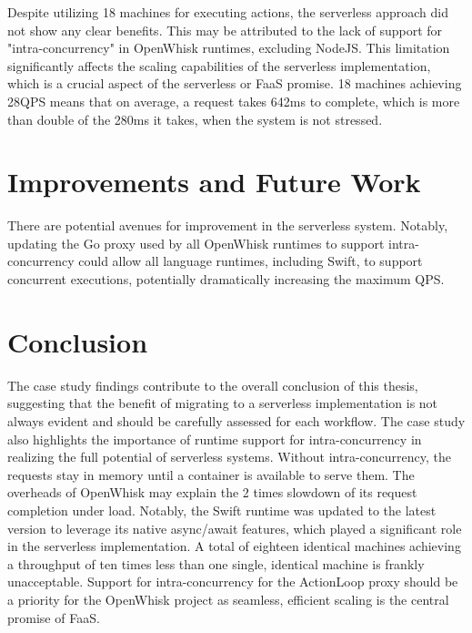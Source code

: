 Despite utilizing 18 machines for executing actions, the serverless approach did not show any clear benefits. This may be attributed to the lack of support for "intra-concurrency" in OpenWhisk runtimes, excluding NodeJS. This limitation significantly affects the scaling capabilities of the serverless implementation, which is a crucial aspect of the serverless or FaaS promise. 18 machines achieving 28QPS means that on average, a request takes 642ms to complete, which is more than double of the 280ms it takes, when the system is not stressed.

\section{Improvements and Future Work}

There are potential avenues for improvement in the serverless system. Notably, updating the Go proxy used by all OpenWhisk runtimes to support intra-concurrency could allow all language runtimes, including Swift, to support concurrent executions, potentially dramatically increasing the maximum QPS.

\section{Conclusion}

The case study findings contribute to the overall conclusion of this thesis, suggesting that the benefit of migrating to a serverless implementation is not always evident and should be carefully assessed for each workflow. The case study also highlights the importance of runtime support for intra-concurrency in realizing the full potential of serverless systems. Without intra-concurrency, the requests stay in memory until a container is available to serve them. The overheads of OpenWhisk may explain the 2 times slowdown of its request completion under load. Notably, the Swift runtime was updated to the latest version to leverage its native async/await features, which played a significant role in the serverless implementation. A total of eighteen identical machines achieving a throughput of ten times less than one single, identical machine is frankly unacceptable. Support for intra-concurrency for the ActionLoop proxy should be a priority for the OpenWhisk project as seamless, efficient scaling is the central promise of FaaS.


